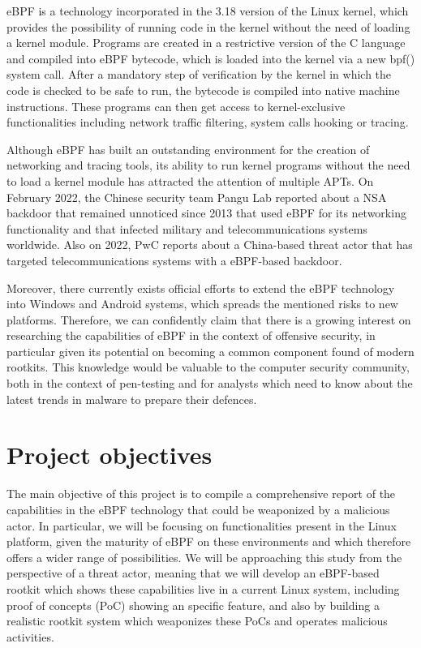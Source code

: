 \documentclass[12pt]{report} %
\begin{document}
eBPF is a technology incorporated in the 3.18 version of the Linux kernel\cite{ebpf_linux318}, which provides the possibility of running code in the kernel without the need of loading a kernel module. Programs are created in a restrictive version of the C language and compiled into eBPF bytecode, which is loaded into the kernel via a new bpf() system call. After a mandatory step of verification by the kernel in which the code is checked to be safe to run, the bytecode is compiled into native machine instructions. These programs can then get access to kernel-exclusive functionalities including network traffic filtering, system calls hooking or tracing.

Although eBPF has built an outstanding environment for the creation of networking and tracing tools, its ability to run kernel programs without the need to load a kernel module has attracted the attention of multiple APTs. On February 2022, the Chinese security team Pangu Lab reported about a NSA backdoor that remained unnoticed since 2013 that used eBPF for its networking functionality and that infected military and telecommunications systems worldwide\cite{bvp47_report}. Also on 2022, PwC reports about a China-based threat actor that has targeted telecommunications systems with a eBPF-based backdoor\cite{bpfdoor_pwc}.

Moreover, there currently exists official efforts to extend the eBPF technology into Windows\cite{ebpf_windows} and Android systems\cite{ebpf_android}, which spreads the mentioned risks to new platforms. Therefore, we can confidently claim that there is a growing interest on researching the capabilities of eBPF in the context of offensive security, in particular given its potential on becoming a common component found of modern rootkits. This knowledge would be valuable to the computer security community, both in the context of pen-testing and for analysts which need to know about the latest trends in malware to prepare their defences.


\section{Project objectives} \label{section:project_objectives}
The main objective of this project is to compile a comprehensive report of the capabilities in the eBPF technology that could be weaponized by a malicious actor. In particular, we will be focusing on functionalities present in the Linux platform, given the maturity of eBPF on these environments and which therefore offers a wider range of possibilities. We will be approaching this study from the perspective of a threat actor, meaning that we will develop an eBPF-based rootkit which shows these capabilities live in a current Linux system, including proof of concepts (PoC) showing an specific feature, and also by building a realistic rootkit system which weaponizes these PoCs and operates malicious activities. 
\end{document}
